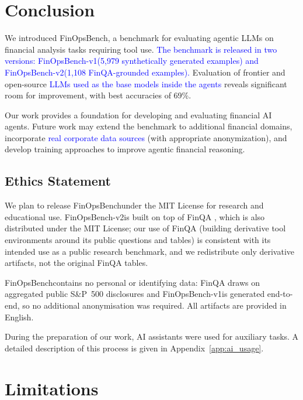 \documentclass[11pt]{article}
\newcommand{\edit}[1]{\textcolor{blue}{#1}}
\newcommand{\editN}[1]{\textcolor{editgreen}{#1}}
\newcommand{\datasetname}{FinOpsBench}\xspace
\newcommand{\synthsubset}{FinOpsBench-v1}\xspace
\newcommand{\groundedfinqa}{FinOpsBench-v2}\xspace
\begin{document}
\section{Conclusion}

We introduced \datasetname, a benchmark for evaluating agentic LLMs on financial analysis tasks requiring tool use. \edit{The benchmark is released in two versions: \synthsubset (5,979 synthetically generated examples) and \groundedfinqa (1,108 FinQA-grounded examples).} Evaluation of frontier and open-source \edit{LLMs used as the base models inside the agents} reveals significant room for improvement, with best accuracies of 69\%.

Our work provides a foundation for developing and evaluating financial AI agents. Future work may extend the benchmark to additional financial domains, incorporate \edit{real corporate data sources} (with appropriate anonymization), and develop training approaches to improve agentic financial reasoning.


\editN{\section*{Ethics Statement}}

\editN{We plan to release \datasetname under the MIT License for research and educational use. \groundedfinqa is built on top of FinQA \citep{chen2021finqa}, which is also distributed under the MIT License; our use of FinQA (building derivative tool environments around its public questions and tables) is consistent with its intended use as a public research benchmark, and we redistribute only derivative artifacts, not the original FinQA tables.}

\editN{\datasetname contains no personal or identifying data: FinQA draws on aggregated public S\&P~500 disclosures and \synthsubset is generated end-to-end, so no additional anonymisation was required. All artifacts are provided in English.}

\editN{During the preparation of our work, AI assistants were used for auxiliary tasks. A detailed description of this process is given in Appendix~\ref{app:ai_usage}.}

\section*{Limitations}
\end{document}
